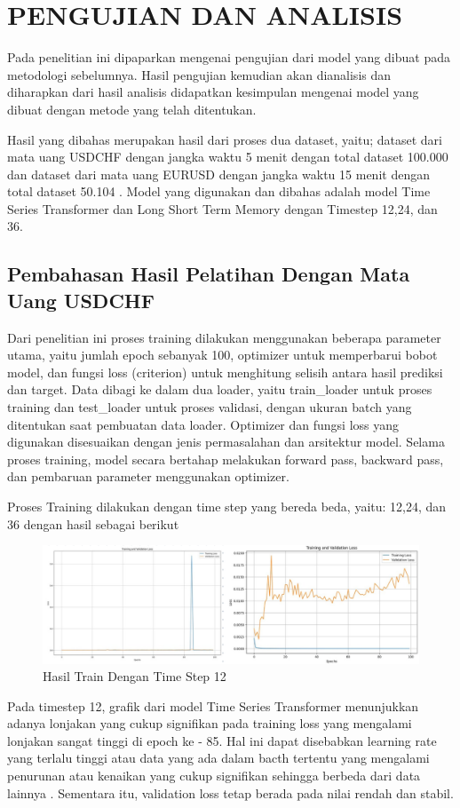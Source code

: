 \chapter{PENGUJIAN DAN ANALISIS}
\label{chap:pengujiananalisis}


Pada penelitian ini dipaparkan mengenai pengujian dari model yang dibuat pada metodologi sebelumnya. Hasil pengujian kemudian akan dianalisis dan diharapkan dari hasil analisis didapatkan kesimpulan mengenai model yang dibuat dengan metode yang telah ditentukan.

Hasil yang dibahas merupakan hasil dari proses dua dataset, yaitu; dataset dari mata uang USDCHF dengan jangka waktu 5 menit dengan total dataset 100.000 dan  dataset dari mata uang EURUSD dengan jangka waktu 15 menit dengan total dataset 50.104 . Model yang digunakan dan dibahas adalah model Time Series Transformer dan Long Short Term Memory dengan Timestep 12,24, dan 36.
\section{Pembahasan Hasil Pelatihan Dengan Mata Uang USDCHF}
Dari penelitian ini proses training dilakukan menggunakan beberapa parameter utama, yaitu jumlah epoch sebanyak 100, optimizer untuk memperbarui bobot model, dan fungsi loss (criterion) untuk menghitung selisih antara hasil prediksi dan target. Data dibagi ke dalam dua loader, yaitu train\_loader untuk proses training dan test\_loader untuk proses validasi, dengan ukuran batch yang ditentukan saat pembuatan data loader. Optimizer dan fungsi loss yang digunakan disesuaikan dengan jenis permasalahan dan arsitektur model. Selama proses training, model secara bertahap melakukan forward pass, backward pass, dan pembaruan parameter menggunakan optimizer. 

Proses Training dilakukan dengan time step yang bereda beda, yaitu: 12,24, dan 36 dengan hasil sebagai berikut
\begin{figure} [H] \centering
    \includegraphics[scale=0.8]{gambar/perbandingan train(12).png} 
    \caption{Hasil Train Dengan Time Step 12}
    \label{fig:label_gambar}
\end{figure}
Pada timestep 12, grafik dari model Time Series Transformer menunjukkan adanya lonjakan yang cukup signifikan pada training loss yang mengalami lonjakan sangat tinggi di epoch ke - 85. Hal ini dapat disebabkan learning rate yang terlalu tinggi atau data yang ada dalam bacth tertentu yang mengalami penurunan atau kenaikan yang cukup signifikan sehingga berbeda dari data lainnya . Sementara itu, validation loss tetap berada pada nilai rendah dan stabil.

